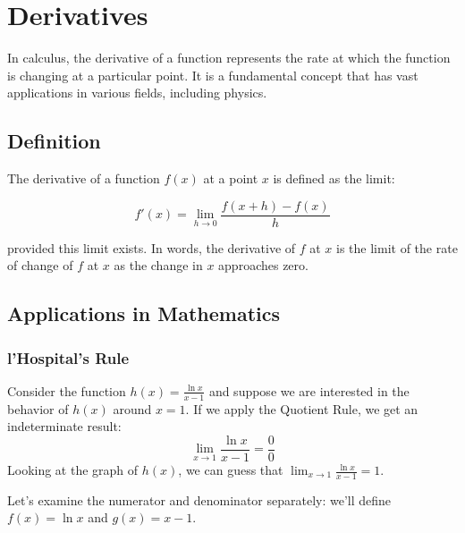 \chapter{Derivatives}

In calculus, the derivative of a function represents the rate at which
the function is changing at a particular point. It is a fundamental
concept that has vast applications in various fields, including
physics.

\section{Definition}

The derivative of a function $f(x)$ at a point $x$ is defined as the limit:

\begin{equation}
f'(x) = \lim_{{h \to 0}} \frac{f(x+h) - f(x)}{h}
\end{equation}

provided this limit exists. In words, the derivative of $f$ at $x$ is
the limit of the rate of change of $f$ at $x$ as the change in $x$
approaches zero.

\section{Applications in Mathematics}
\subsection{l'Hospital's Rule}
Consider the function $h(x) = \frac{\ln{x}}{x-1}$ and suppose we are interested in the behavior of $h(x)$ around $x=1$. If we apply the Quotient Rule, we get an indeterminate result: $$\lim_{x \to 1}\frac{\ln{x}}{x-1} = \frac{0}{0}$$ Looking at the graph of $h(x)$, we can guess that $\lim_{x \to 1}\frac{\ln{x}}{x-1} = 1$. 


Let's examine the numerator and denominator separately: we'll define $f(x)=\ln{x}$ and $g(x) = x-1$. 

